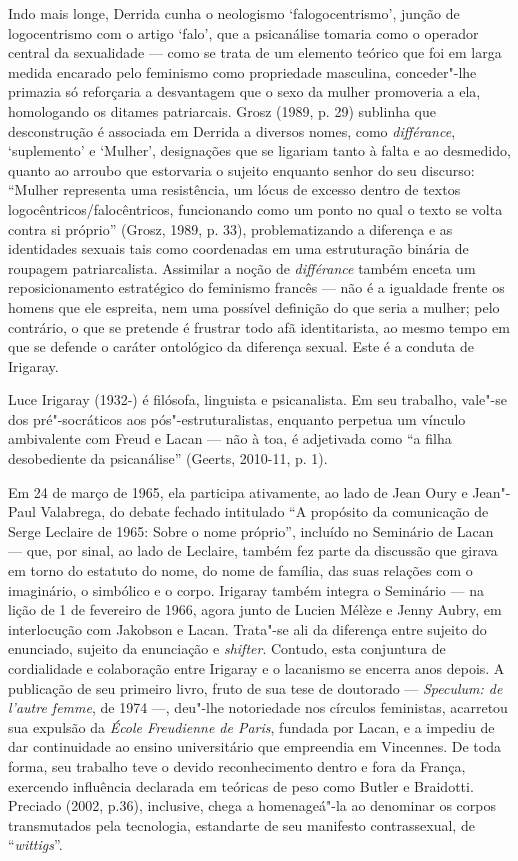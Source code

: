 Indo mais longe, Derrida cunha o neologismo `falogocentrismo', junção de
logocentrismo com o artigo `falo', que a psicanálise tomaria como o
operador central da sexualidade --- como se trata de um elemento teórico
que foi em larga medida encarado pelo feminismo como propriedade
masculina, conceder"-lhe primazia só reforçaria a desvantagem que o sexo
da mulher promoveria a ela, homologando os ditames patriarcais. Grosz
(1989, p. 29) sublinha que desconstrução é associada em Derrida a
diversos nomes, como \emph{différance}, `suplemento' e `Mulher',
designações que se ligariam tanto à falta e ao desmedido, quanto ao
arroubo que estorvaria o sujeito enquanto senhor do seu discurso:
``Mulher representa uma resistência, um lócus de excesso dentro de
textos logocêntricos/falocêntricos, funcionando como um ponto no qual o
texto se volta contra si próprio'' (Grosz, 1989, p. 33), problematizando
a diferença e as identidades sexuais tais como coordenadas em uma
estruturação binária de roupagem patriarcalista. Assimilar a noção de
\emph{différance} também enceta um reposicionamento estratégico do
feminismo francês --- não é a igualdade frente os homens que ele
espreita, nem uma possível definição do que seria a mulher; pelo
contrário, o que se pretende é frustrar todo afã identitarista, ao mesmo
tempo em que se defende o caráter ontológico da diferença sexual. Este é
a conduta de Irigaray.

Luce Irigaray (1932-) é filósofa, linguista e psicanalista. Em seu
trabalho, vale"-se dos pré"-socráticos aos pós"-estruturalistas, enquanto
perpetua um vínculo ambivalente com Freud e Lacan --- não à toa, é
adjetivada como ``a filha desobediente da psicanálise'' (Geerts,
2010-11, p. 1).

Em 24 de março de 1965, ela participa ativamente, ao lado de Jean Oury e
Jean"-Paul Valabrega, do debate fechado intitulado ``A propósito da
comunicação de Serge Leclaire de 1965: Sobre o nome próprio'', incluído
no Seminário  de Lacan --- que, por sinal, ao lado de Leclaire, também
fez parte da discussão que girava em torno do estatuto do nome, do nome
de família, das suas relações com o imaginário, o simbólico e o corpo.
Irigaray também integra o Seminário  --- na lição de 1 de fevereiro de
1966, agora junto de Lucien Mélèze e Jenny Aubry, em interlocução com
Jakobson e Lacan. Trata"-se ali da diferença entre sujeito do enunciado,
sujeito da enunciação e \emph{shifter}. Contudo, esta conjuntura de
cordialidade e colaboração entre Irigaray e o lacanismo se encerra anos
depois. A publicação de seu primeiro livro, fruto de sua tese de
doutorado --- \emph{Speculum: de l'autre femme}, de 1974 ---, deu"-lhe
notoriedade nos círculos feministas, acarretou sua expulsão da
\emph{École Freudienne de Paris}, fundada por Lacan, e a impediu de dar
continuidade ao ensino universitário que empreendia em Vincennes. De
toda forma, seu trabalho teve o devido reconhecimento dentro e fora da
França, exercendo influência declarada em teóricas de peso como Butler e
Braidotti. Preciado (2002, p.36), inclusive, chega a homenageá"-la ao
denominar os corpos transmutados pela tecnologia, estandarte de seu
manifesto contrassexual, de ``\emph{wittigs}''.

